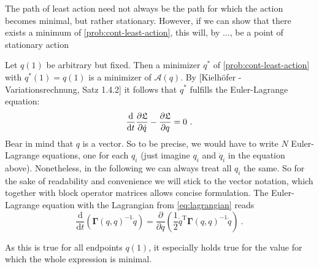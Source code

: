 The path of least action need not always be the path for which the action becomes minimal, but rather stationary.
However, if we can show that there exists a minimum of \cref{prob:cont-least-action}, this will, by ..., be a point of stationary action

Let $q(1)$ be arbitrary but fixed.
Then a minimizer $q^\ast$ of \cref{prob:cont-least-action} with $q^\ast(1) = q(1)$ is a minimizer of $\mathcal{A}(q)$.
By [Kielhöfer - Variationsrechnung, Satz 1.4.2] it follows that $q^\ast$ fulfills the Euler-Lagrange equation:
\begin{equation}
	\frac{\mathrm{d}}{\mathrm{d}t} \frac{\partial \fL}{\partial \dot{q}} - \frac{\partial \fL}{\partial q} = 0 \ .
\end{equation}
Bear in mind that $q$ is a vector.
So to be precise, we would have to write $N$ Euler-Lagrange equations, one for each $q_i$ (just imagine $q_i$ and $\dot{q}_i$ in the equation above).
Nonetheless, in the following we can always treat all $q_i$ the same.
So for the sake of readability and convenience we will stick to the vector notation, which together with block operator matrices allows concise formulation.
The Euler-Lagrange equation with the Lagrangian from \cref{eq:lagrangian} reads
\begin{equation}
\label{eq:concrete-lagrangian}
	\frac{\mathrm{d}}{\mathrm{d}t} \left(\mathbf{\Gamma}(q, q)^{-1} \dot{q} \right)
	= \frac{\partial}{\partial q} \left(\frac{1}{2} \dot{q}^\mathrm{T} \mathbf{\Gamma}(q, q)^{-1} \dot{q}\right) \ .
\end{equation}

As this is true for all endpoints $q(1)$, it especially holds true for the value for which the whole expression is minimal.